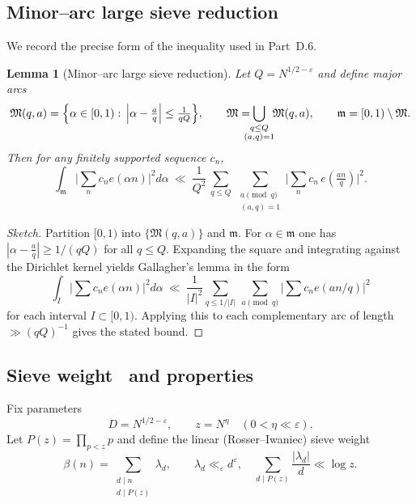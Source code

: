 \documentclass[11pt]{article}
\newtheorem{lemma}{Lemma}[part]
\theoremstyle{definition}
\theoremstyle{remark}
\numberwithin{equation}{part}
\begin{document}
\subsection{Minor--arc large sieve reduction}

We record the precise form of the inequality used in Part~D.6.

\begin{lemma}[Minor--arc large sieve reduction]\label{lem:largesieve-minor}
	Let $Q=N^{1/2-\varepsilon}$ and define major arcs
	\[
		\mathfrak M(q,a)=\Bigl\{\alpha\in[0,1):\,\Big|\alpha-\tfrac{a}{q}\Big|\le \tfrac{1}{qQ}\Bigr\},
		\qquad \mathfrak M=\!\!\!\!\!\bigcup_{\substack{q\le Q\\ (a,q)=1}}\!\!\mathfrak M(q,a),
		\qquad \mathfrak m=[0,1)\setminus\mathfrak M.
	\]
	Then for any finitely supported sequence $c_n$,
	\[
		\int_{\mathfrak m}\Big|\sum_{n}c_n e(\alpha n)\Big|^2 d\alpha
		\ \ll\ \frac{1}{Q^2}\,
		\sum_{q\le Q}\ \sum_{\substack{a\!\!\!\pmod q\\ (a,q)=1}}
		\Big|\sum_{n} c_n\,e\!\left(\tfrac{an}{q}\right)\Big|^2.
	\]
\end{lemma}

\begin{proof}[Sketch]
	Partition $[0,1)$ into $\{\mathfrak M(q,a)\}$ and $\mathfrak m$. For $\alpha\in\mathfrak m$ one has
	$|\alpha-\tfrac aq|\ge 1/(qQ)$ for all $q\le Q$. Expanding the square and integrating against the Dirichlet kernel yields Gallagher's lemma in the form
	\[
		\int_{I} \Big|\sum c_n e(\alpha n)\Big|^2 d\alpha
		\ \ll\ \frac{1}{|I|^2}\sum_{q\le 1/|I|}\ \sum_{a\pmod q}\Big|\sum c_n e(an/q)\Big|^2
	\]
	for each interval $I\subset[0,1)$. Applying this to each complementary arc of length $\gg (qQ)^{-1}$ gives the stated bound.
\end{proof}

\subsection{Sieve weight \textbeta\ and properties}

Fix parameters
\[
	D=N^{1/2-\varepsilon},\qquad z=N^{\eta}\quad(0<\eta\ll \varepsilon).
\]
Let $P(z)=\prod_{p<z}p$ and define the linear (Rosser--Iwaniec) sieve weight
\[
	\beta(n)=\sum_{\substack{d\mid n\\ d\mid P(z)}} \lambda_d,\qquad
	\lambda_d\ll_\varepsilon d^{\varepsilon},\quad
	\sum_{d\mid P(z)}\frac{|\lambda_d|}{d}\ll \log z.
\]
\end{document}
